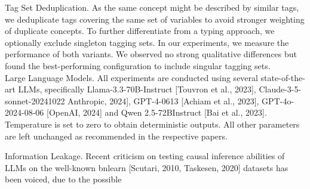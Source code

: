 \documentclass[10pt]{article}
\begin{document}
Tag Set Deduplication. As the same concept might be described by similar tags, we deduplicate tags covering the same set of variables to avoid stronger weighting of duplicate concepts. To further differentiate from a typing approach, we optionally exclude singleton tagging sets. In our experiments, we measure the performance of both variants. We observed no strong qualitative differences but found the best-performing configuration to include singular tagging sets.\\[0pt]
Large Language Models. All experiments are conducted using several state-of-the-art LLMs, specifically Llama-3.3-70B-Instruct [Touvron et al., 2023], Claude-3-5-sonnet-20241022 Anthropic, 2024], GPT-4-0613 [Achiam et al., 2023], GPT-4o-2024-08-06 [OpenAI, 2024] and Qwen 2.5-72BInstruct [Bai et al., 2023]. Temperature is set to zero to obtain deterministic outputs. All other parameters are left unchanged as recommended in the respective papers.

Information Leakage. Recent criticism on testing causal inference abilities of LLMs on the well-known bnlearn [Scutari, 2010, Taskesen, 2020] datasets has been voiced, due to the possible
\end{document}
